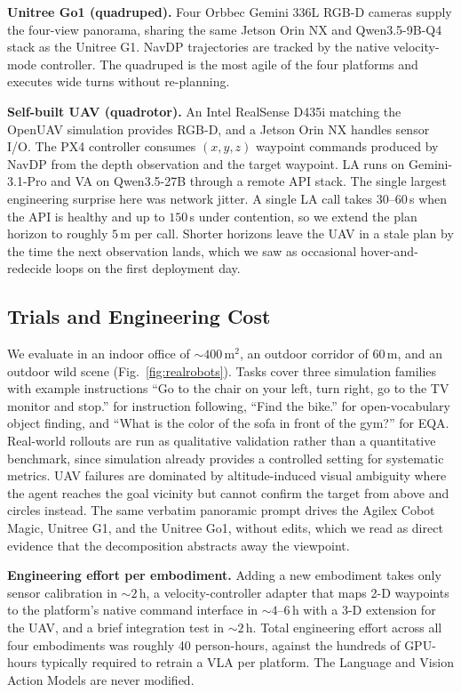 \documentclass[conference]{IEEEtran}
\begin{document}
\textbf{Unitree Go1 (quadruped).} Four Orbbec Gemini 336L
RGB-D cameras supply the four-view panorama, sharing the same Jetson Orin
NX and Qwen3.5-9B-Q4 stack as the Unitree G1. NavDP
trajectories are tracked by the native velocity-mode controller. The quadruped
is the most agile of the four platforms and executes wide turns without
re-planning.

\textbf{Self-built UAV (quadrotor).} An Intel RealSense D435i matching the
OpenUAV simulation provides RGB-D, and a Jetson Orin NX handles sensor I/O.
The PX4 controller consumes $(x,y,z)$ waypoint commands produced by NavDP from
the depth observation and the target waypoint. LA runs on Gemini-3.1-Pro and
VA on Qwen3.5-27B through a remote API stack. The single largest engineering
surprise here was network jitter. A single LA call takes $30$--$60$\,s when
the API is healthy and up to $150$\,s under contention, so we extend the plan
horizon to roughly $5$\,m per call. Shorter horizons leave the UAV in a stale
plan by the time the next observation lands, which we saw as occasional
hover-and-redecide loops on the first deployment day.

\subsection{Trials and Engineering Cost}

We evaluate in an indoor office of $\sim$$400$\,m$^2$, an outdoor corridor
of $60$\,m, and an outdoor wild scene
(Fig.~\ref{fig:realrobots}). Tasks cover three simulation families with example instructions
``Go to the chair on your left, turn right, go to the TV monitor and stop.''
for instruction following, ``Find the bike.'' for open-vocabulary object
finding, and ``What is the color of the sofa in front of the gym?'' for EQA.
Real-world rollouts are run as qualitative validation rather than a
quantitative benchmark, since simulation already provides a controlled setting
for systematic metrics. UAV failures are dominated by altitude-induced visual
ambiguity where the agent reaches the goal vicinity but cannot confirm the
target from above and circles instead. The same verbatim panoramic prompt
drives the Agilex Cobot Magic, Unitree G1, and the Unitree Go1, without edits, which we read as
direct evidence that the decomposition abstracts away the viewpoint.

\textbf{Engineering effort per embodiment.} Adding a new
embodiment takes only sensor calibration in $\sim$$2$\,h, a
velocity-controller adapter that maps 2-D waypoints to the platform's native
command interface in $\sim$$4$--$6$\,h with a 3-D extension for the UAV, and a
brief integration test in $\sim$$2$\,h. Total engineering effort across all
four embodiments was roughly 40 person-hours, against the hundreds of
GPU-hours typically required to retrain a VLA per platform. The Language and
Vision Action Models are never modified.
\end{document}
